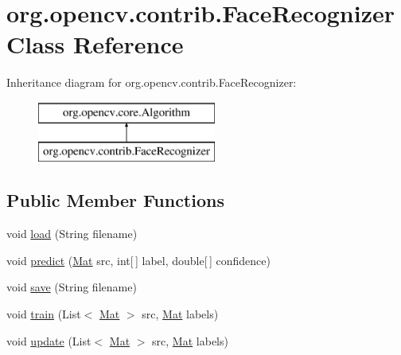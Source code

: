 \hypertarget{classorg_1_1opencv_1_1contrib_1_1_face_recognizer}{}\section{org.\+opencv.\+contrib.\+Face\+Recognizer Class Reference}
\label{classorg_1_1opencv_1_1contrib_1_1_face_recognizer}
Inheritance diagram for org.\+opencv.\+contrib.\+Face\+Recognizer\+:\begin{figure}[H]
\begin{center}
\leavevmode
\includegraphics[height=2.000000cm]{classorg_1_1opencv_1_1contrib_1_1_face_recognizer}
\end{center}
\end{figure}
\subsection*{Public Member Functions}
\begin{DoxyCompactItemize}
\item 
void \mbox{\hyperlink{classorg_1_1opencv_1_1contrib_1_1_face_recognizer_a3deb06ef030354b7e805eba3eec638f6}{load}} (String filename)
\item 
void \mbox{\hyperlink{classorg_1_1opencv_1_1contrib_1_1_face_recognizer_afed81d21859557ca5680504353d7454e}{predict}} (\mbox{\hyperlink{classorg_1_1opencv_1_1core_1_1_mat}{Mat}} src, int\mbox{[}$\,$\mbox{]} label, double\mbox{[}$\,$\mbox{]} confidence)
\item 
void \mbox{\hyperlink{classorg_1_1opencv_1_1contrib_1_1_face_recognizer_aef1ba7d7342373b5da025c96fcd2c1d6}{save}} (String filename)
\item 
void \mbox{\hyperlink{classorg_1_1opencv_1_1contrib_1_1_face_recognizer_a2b9e657ee7276997ab184449c3251c08}{train}} (List$<$ \mbox{\hyperlink{classorg_1_1opencv_1_1core_1_1_mat}{Mat}} $>$ src, \mbox{\hyperlink{classorg_1_1opencv_1_1core_1_1_mat}{Mat}} labels)
\item 
void \mbox{\hyperlink{classorg_1_1opencv_1_1contrib_1_1_face_recognizer_aeda4a33d567af3958ff63c79355aaa72}{update}} (List$<$ \mbox{\hyperlink{classorg_1_1opencv_1_1core_1_1_mat}{Mat}} $>$ src, \mbox{\hyperlink{classorg_1_1opencv_1_1core_1_1_mat}{Mat}} labels)
\end{DoxyCompactItemize}
